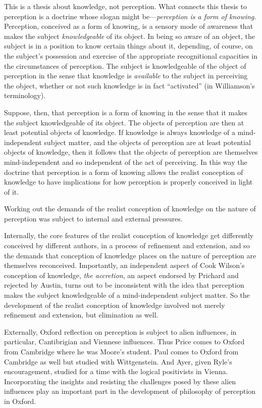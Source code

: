 This is a thesis about knowledge, not perception. What connects this thesis to perception is a doctrine whose slogan might be---\emph{perception is a form of knowing}. Perception, conceived as a form of knowing, is a sensory mode of awareness that makes the subject \emph{knowledgeable} of its object. In being so aware of an object, the subject is in a position to know certain things about it, depending, of course, on the subject's possession and exercise of the appropriate recognitional capacities in the circumstances of perception. The subject is knowledgeable of the object of perception in the sense that knowledge is \emph{available} to the subject in perceiving the object, whether or not such knowledge is in fact ``activated'' (in Williamson's \citeyear{Williamson:1990uq} terminology).

Suppose, then, that perception is a form of knowing in the sense that it makes the subject knowledgeable of its object. The objects of perception are then at least potential objects of knowledge. If knowledge is always knowledge of a mind-independent subject matter, and the objects of perception are at least potential objects of knowledge, then it follows that the objects of perception are themselves mind-independent and so independent of the act of perceiving. In this way the doctrine that perception is a form of knowing allows the realist conception of knowledge to have implications for how perception is properly conceived in light of it.

Working out the demands of the realist conception of knowledge on the nature of perception was subject to internal and external pressures. 

Internally, the core features of the realist conception of knowledge get differently conceived by different authors, in a process of refinement and extension, and so the demands that conception of knowledge places on the nature of perception are themselves reconceived. Importantly, an independent aspect of Cook Wilson's conception of knowledge, \emph{the accretion}, an aspect endorsed by Prichard and rejected by Austin, turns out to be inconsistent with the idea that perception makes the subject knowledgeable of a mind-independent subject matter. So the development of the realist conception of knowledge involved not merely refinement and extension, but elimination as well.

Externally, Oxford reflection on perception is subject to alien influences, in particular, Cantibrigian and Viennese influences. Thus Price comes to Oxford from Cambridge where he was Moore's student. Paul comes to Oxford from Cambridge as well but studied with Wittgenstein. And Ayer, given Ryle's encouragement, studied for a time with the logical positivists in Vienna. Incorporating the insights and resisting the challenges posed by these alien influences play an important part in the development of philosophy of perception in Oxford.

